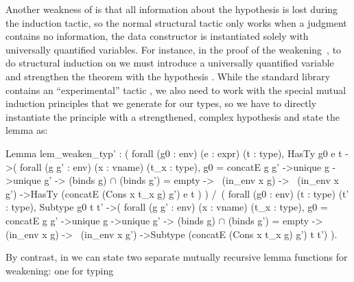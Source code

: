 Another weakness of \coq is that all 
information about the hypothesis is lost during the induction
tactic, so the normal structural  tactic only works when
a judgment contains no information, \ie the data constructor
is instantiated solely with universally quantified
variables. 
%
For instance, in the proof of the weakening~,
to do structural induction on %
we must introduce a universally quantified variable 
and strengthen the theorem with the hypothesis
.
%
While the standard library contains an ``experimental'' tactic 
, we also need to work with 
the special mutual induction principles that we generate for
our types, so we have to directly instantiate the principle
with a strengthened, complex hypothesis%
and state the lemma as:
\begin{mcode}
  Lemma lem_weaken_typ' : ( forall (g0 : env) (e : expr) (t : type),
    HasTy g0 e t ->( forall (g g' : env) (x : vname) (t_x : type),
        g0 = concatE g g' ->unique g ->unique g' ->
        (binds g) $\cap $ (binds g') = empty ->~ (in_env x g) ->~ (in_env x g')
        ->HasTy (concatE (Cons x t_x g) g') e t ) ) /\ (
  forall (g0 : env) (t : type) (t' : type),
    Subtype g0 t t' ->( forall (g g' : env) (x : vname) (t_x : type),
        g0 = concatE g g' ->unique g ->unique g' -> 
        (binds g) $\cap $ (binds g') = empty ->~ (in_env x g) ->~ (in_env x g')
        ->Subtype (concatE (Cons x t_x g) g') t t') ).
\end{mcode}
%
By contrast, in \lh we can state two separate mutually recursive
lemma functions for weakening: one for typing
